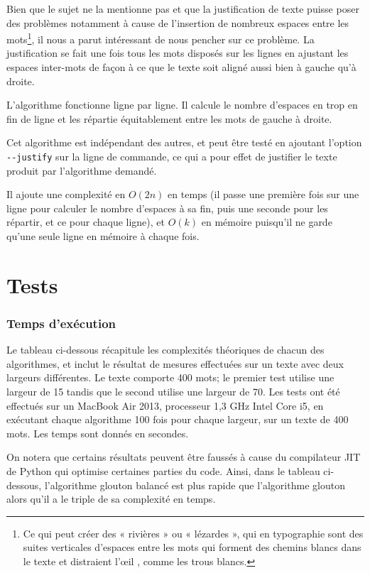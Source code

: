 \documentclass[a4paper, 11pt]{article}
\begin{document}
Bien que le sujet ne la mentionne pas et que la justification de texte puisse
poser des problèmes \cite{Van96cognitive} notamment à cause de l'insertion de
nombreux espaces entre les mots\footnote{Ce qui peut créer des « rivières » ou
« lézardes », qui en typographie sont des suites verticales d'espaces entre les
mots qui forment des chemins blancs dans le texte et distraient l'œil
\cite{Harkins12fr}, comme les trous blancs.}, il nous a parut intéressant de
nous pencher sur ce problème. La justification se fait une fois tous les mots
disposés sur les lignes en ajustant les espaces inter-mots de façon à ce que le
texte soit aligné aussi bien à gauche qu'à droite.

L'algorithme fonctionne ligne par ligne. Il calcule le nombre d'espaces en trop
en fin de ligne et les répartie équitablement entre les mots de gauche à droite.

Cet algorithme est indépendant des autres, et peut être testé en ajoutant
l'option \verb|--justify| sur la ligne de commande, ce qui a pour effet de
justifier le texte produit par l'algorithme demandé.

Il ajoute une complexité en $O(2n)$ en temps (il passe une première fois sur une
ligne pour calculer le nombre d'espaces à sa fin, puis une seconde pour les
répartir, et ce pour chaque ligne), et $O(k)$ en mémoire puisqu'il ne garde
qu'une seule ligne en mémoire à chaque fois.

\part{Tests}

\section{Temps d'exécution}

Le tableau ci-dessous récapitule les complexités théoriques de chacun des
algorithmes, et inclut le résultat de mesures effectuées sur un texte avec deux
largeurs différentes. Le texte comporte 400 mots; le premier test utilise une
largeur de 15 tandis que le second utilise une largeur de 70. Les tests ont été
effectués sur un MacBook Air 2013, processeur 1,3 GHz Intel Core i5, en
exécutant chaque algorithme 100 fois pour chaque largeur, sur un texte de 400
mots. Les temps sont donnés en secondes.

On notera que certains résultats peuvent être faussés à cause du compilateur JIT
de Python qui optimise certaines parties du code. Ainsi, dans le tableau
ci-dessous, l'algorithme glouton balancé est plus rapide que l'algorithme
glouton alors qu'il a le triple de sa complexité en temps.
\end{document}
